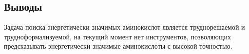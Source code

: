 \cite{hotspots}

\cite{very_good}

\cite{interface_dist_cutoff, water, orings}
\subsection{Выводы}
Задача поиска энергетически значимых аминокислот является труднорешаемой и трудноформализуемой, на текущий момент нет  инструментов, позволяющих предсказывать энергетически значимые аминокислоты с высокой точностью. 

